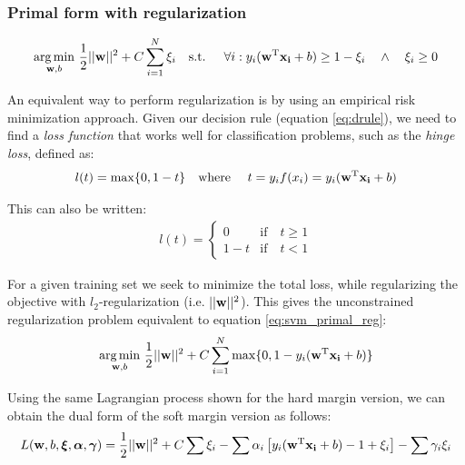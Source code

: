 \subsubsection*{Primal form with regularization}
\begin{align}\label{eq:svm_primal_reg} 
    \underset{\mathbf{w}, b}{\text{arg} \min}\ \frac{1}{2} ||\mathbf{w}||^2 + C \sum_{i=1}^{N} \xi_i
    \text{\quad s.t. \quad} 
    \forall i : y_i (\mathbf{w}^{\text{T}} \mathbf{x_i} + b) \ge 1 - \xi_i \quad \land \quad \xi_i \ge 0
\end{align}

An equivalent way to perform regularization is by using an empirical risk mini\-mization approach. Given our decision rule (equation \ref{eq:drule}), we need to find a \emph{loss function} that works well for classification problems, such as the \emph{hinge loss}, defined as:
\begin{align}
    l(t) = \max \{0, 1 - t\} \text{\quad where \quad} t = y_if(x_i) = y_i (\mathbf{w}^{\text{T}} \mathbf{x_i} + b)
\end{align}

This can also be written:
\begin{align*}
    l(t) = \left\{
        \begin{array}{ll}
            0   & \mbox{if} \quad t \ge 1 \\
            1-t & \mbox{if} \quad t < 1  
        \end{array}
    \right.
\end{align*}

For a given training set we seek to minimize the total loss, while regularizing the objective with $l_2$-regularization (i.e. $||\mathbf{w}||^2$). This gives the unconstrained reg\-u\-lar\-iza\-tion problem equivalent to equation \ref{eq:svm_primal_reg}:
\begin{align}
    \underset{\mathbf{w}, b}{\text{arg} \min}\ \frac{1}{2} ||\mathbf{w}||^2 + C \sum_{i=1}^{N} \max \{0, 1 -  y_i (\mathbf{w}^{\text{T}} \mathbf{x_i} + b)\}
\end{align}

Using the same Lagrangian process shown for the hard margin version, we can obtain the dual form of the soft margin version as follows:
\begin{align*}
    L(\mathbf{w}, b, \boldsymbol{\xi}, \boldsymbol{\alpha}, \boldsymbol{\gamma}) = 
    \frac{1}{2} ||\mathbf{w}||^2 + C \sum \xi_i
    - \sum \alpha_i \left[ y_i (\mathbf{w}^{\text{T}} \mathbf{x_i} + b) - 1 + \xi_i \right]
    - \sum \gamma_i \xi_i
\end{align*}

